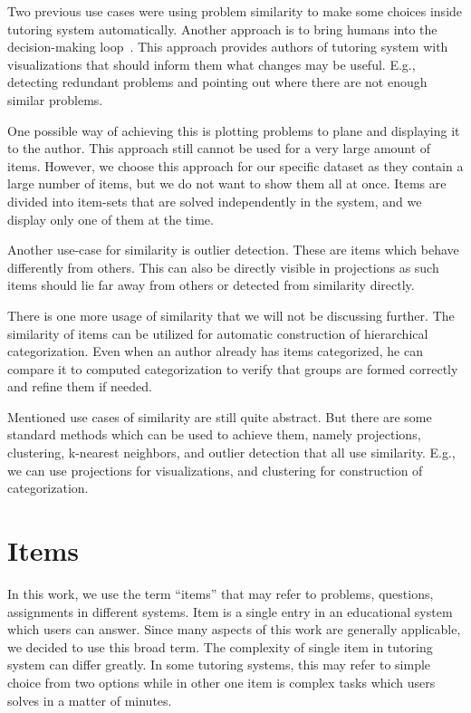 \documentclass[
  print, %
  table,   %
  nolof,     %
  nolot,     %
  nocover,
  color,
  final,
]{fithesis3}
\begin{document}
Two previous use cases were using problem similarity to make some choices inside tutoring system automatically. Another approach is to bring humans into the decision-making loop~\cite{baker2016stupid}. This approach provides authors of tutoring system with visualizations that should inform them what changes may be useful. E.g., detecting redundant problems and pointing out where there are not enough similar problems.

One possible way of achieving this is plotting problems to plane and displaying it to the author. This approach still cannot be used for a very large amount of items. However, we choose this approach for our specific dataset as they contain a large number of items, but we do not want to show them all at once. Items are divided into item-sets that are solved independently in the system, and we display only one of them at the time.

Another use-case for similarity is outlier detection. These are items which behave differently from others. This can also be directly visible in projections as such items should lie far away from others or detected from similarity directly.

There is one more usage of similarity that we will not be discussing further. The similarity of items can be utilized for automatic construction of hierarchical categorization. Even when an author already has items categorized, he can compare it to computed categorization to verify that groups are formed correctly and refine them if needed.


Mentioned use cases of similarity are still quite abstract. But there are some standard methods which can be used to achieve them, namely projections, clustering, k-nearest neighbors, and outlier detection that all use similarity. E.g., we can use projections for visualizations, and clustering for construction of categorization.


\section{Items}\label{items}


In this work, we use the term ``items'' that may refer to problems, questions, assignments in different systems. Item is a single entry in an educational system which users can answer. Since many aspects of this work are generally applicable, we decided to use this broad term. The complexity of single item in tutoring system can differ greatly. In some tutoring systems, this may refer to simple choice from two options while in other one item is complex tasks which users solves in a matter of minutes.
\end{document}

